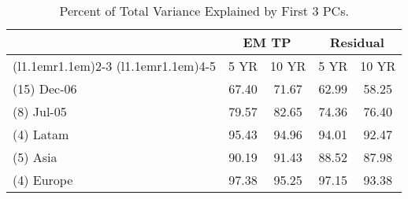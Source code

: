 \begin{footnotesize}\begin{table}\centering\begin{tabular}{l|cccc}
\toprule
\multicolumn{1}{c}{} &\multicolumn{2}{c}{EM TP}&\multicolumn{2}{c}{Residual}\\
\cmidrule(l{1.1em}r{1.1em}){2-3} \cmidrule(l{1.1em}r{1.1em}){4-5}
\multicolumn{1}{c}{} & 5 YR & 10 YR & 5 YR & 10 YR \\
\midrule
(15) Dec-06 & 67.40 & 71.67 & 62.99 & 58.25 \\(8)  Jul-05 & 79.57 & 82.65 & 74.36 & 76.40 \\(4)  Latam & 95.43 & 94.96 & 94.01 & 92.47 \\(5)  Asia & 90.19 & 91.43 & 88.52 & 87.98 \\(4)  Europe & 97.38 & 95.25 & 97.15 & 93.38 \\\bottomrule\end{tabular}\caption{Percent of Total Variance Explained by First 3 PCs.}\label{table:CmnFctrs}\end{table}\end{footnotesize}